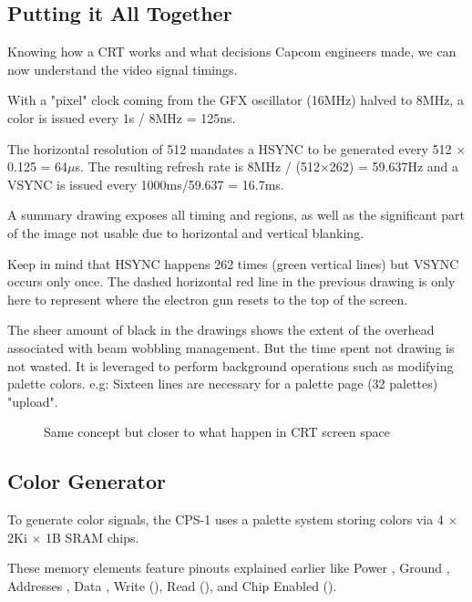 \subsection{Putting it All Together}

Knowing how a CRT works and what decisions Capcom engineers made, we can now understand the video signal timings.

With a "pixel" clock coming from the GFX oscillator (16MHz) halved to 8MHz, a color is issued every 1s / 8MHz = 125ns.

The horizontal resolution of 512 mandates a HSYNC to be generated every 512 $\times$ 0.125 = 64$\mu$s. The resulting refresh rate is 8MHz / (512$\times$262) = 59.637Hz and a VSYNC is issued every 1000ms/59.637 = 16.7ms.


A summary drawing exposes all timing and regions, as well as the significant part of the image not usable due to horizontal and vertical blanking.






Keep in mind that HSYNC happens 262 times (green vertical lines) but VSYNC occurs only once. The dashed horizontal red line in the previous drawing is only here to represent where the electron gun resets to the top of the screen.

The sheer amount of black in the drawings shows the extent of the overhead associated with beam wobbling management. But the time spent not drawing is not wasted. It is leveraged to perform background operations such as modifying palette colors. e.g: Sixteen lines are necessary for a palette page (32 palettes) "upload".

\begin{figure}[H]
\caption*{Same concept but closer to what happen in CRT screen space}
\end{figure}


\subsection{Color Generator}

To generate color signals, the CPS-1 uses a palette system storing colors via 4 $\times$ 2Ki $\times$ 1B  SRAM chips.


These memory elements feature pinouts explained earlier like Power , Ground , Addresses , Data , Write (), Read (), and Chip Enabled ().

